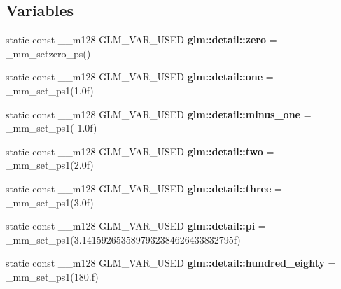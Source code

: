 \subsection*{Variables}
\begin{DoxyCompactItemize}
\item 
\hypertarget{namespaceglm_1_1detail_a60dd9c5a87ade0ec9bb3fa0b24a5f30a}{}static const \+\_\+\+\_\+m128 G\+L\+M\+\_\+\+V\+A\+R\+\_\+\+U\+S\+E\+D {\bfseries glm\+::detail\+::zero} = \+\_\+mm\+\_\+setzero\+\_\+ps()\label{namespaceglm_1_1detail_a60dd9c5a87ade0ec9bb3fa0b24a5f30a}

\item 
\hypertarget{namespaceglm_1_1detail_a1c53e16256347440cf50b7db9e0d3cdb}{}static const \+\_\+\+\_\+m128 G\+L\+M\+\_\+\+V\+A\+R\+\_\+\+U\+S\+E\+D {\bfseries glm\+::detail\+::one} = \+\_\+mm\+\_\+set\+\_\+ps1(1.\+0f)\label{namespaceglm_1_1detail_a1c53e16256347440cf50b7db9e0d3cdb}

\item 
\hypertarget{namespaceglm_1_1detail_accc46257e5a1b8d1dde691bafd9c0cf0}{}static const \+\_\+\+\_\+m128 G\+L\+M\+\_\+\+V\+A\+R\+\_\+\+U\+S\+E\+D {\bfseries glm\+::detail\+::minus\+\_\+one} = \+\_\+mm\+\_\+set\+\_\+ps1(-\/1.\+0f)\label{namespaceglm_1_1detail_accc46257e5a1b8d1dde691bafd9c0cf0}

\item 
\hypertarget{namespaceglm_1_1detail_ab02efa4d9e1001ea452c29c42c5abb9d}{}static const \+\_\+\+\_\+m128 G\+L\+M\+\_\+\+V\+A\+R\+\_\+\+U\+S\+E\+D {\bfseries glm\+::detail\+::two} = \+\_\+mm\+\_\+set\+\_\+ps1(2.\+0f)\label{namespaceglm_1_1detail_ab02efa4d9e1001ea452c29c42c5abb9d}

\item 
\hypertarget{namespaceglm_1_1detail_ac1268a3af95dc83328113d83e5006912}{}static const \+\_\+\+\_\+m128 G\+L\+M\+\_\+\+V\+A\+R\+\_\+\+U\+S\+E\+D {\bfseries glm\+::detail\+::three} = \+\_\+mm\+\_\+set\+\_\+ps1(3.\+0f)\label{namespaceglm_1_1detail_ac1268a3af95dc83328113d83e5006912}

\item 
\hypertarget{namespaceglm_1_1detail_aa46f77a132dfa32445b74016f37e9bf0}{}static const \+\_\+\+\_\+m128 G\+L\+M\+\_\+\+V\+A\+R\+\_\+\+U\+S\+E\+D {\bfseries glm\+::detail\+::pi} = \+\_\+mm\+\_\+set\+\_\+ps1(3.\+1415926535897932384626433832795f)\label{namespaceglm_1_1detail_aa46f77a132dfa32445b74016f37e9bf0}

\item 
\hypertarget{namespaceglm_1_1detail_ac7247ff9c28f20d022c8c7fb9ef425b4}{}static const \+\_\+\+\_\+m128 G\+L\+M\+\_\+\+V\+A\+R\+\_\+\+U\+S\+E\+D {\bfseries glm\+::detail\+::hundred\+\_\+eighty} = \+\_\+mm\+\_\+set\+\_\+ps1(180.f)\label{namespaceglm_1_1detail_ac7247ff9c28f20d022c8c7fb9ef425b4}


\end{DoxyCompactItemize}
